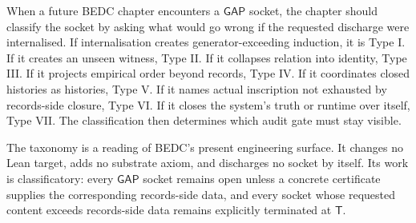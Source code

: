 \begin{remark}
\label{rem:transcendental-supply-use}
When a future BEDC chapter encounters a $\mathsf{GAP}$ socket, the chapter should classify the socket by asking what would go wrong if the requested discharge were internalised. If internalisation creates generator-exceeding induction, it is Type I. If it creates an unseen witness, Type II. If it collapses relation into identity, Type III. If it projects empirical order beyond records, Type IV. If it coordinates closed histories as histories, Type V. If it names actual inscription not exhausted by records-side closure, Type VI. If it closes the system's truth or runtime over itself, Type VII. The classification then determines which audit gate must stay visible.
\end{remark}

\begin{remark}
\label{rem:transcendental-supply-current-state}
The taxonomy is a reading of BEDC's present engineering surface. It changes no Lean target, adds no substrate axiom, and discharges no socket by itself. Its work is classificatory: every $\mathsf{GAP}$ socket remains open unless a concrete certificate supplies the corresponding records-side data, and every socket whose requested content exceeds records-side data remains explicitly terminated at $\mathsf{T}$.
\end{remark}


